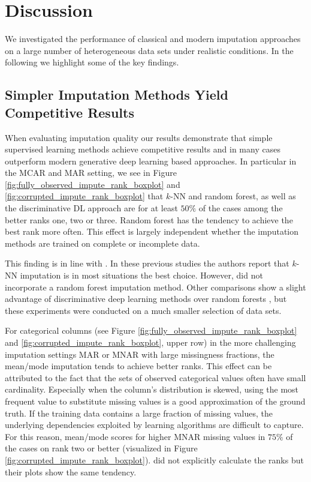 \section{Discussion}
\label{sec:discussion}

We investigated the performance of classical and modern imputation approaches on a large number of heterogeneous data sets under realistic conditions. In the following we highlight some of the key findings.

\subsection{Simpler Imputation Methods Yield Competitive Results}
%
When evaluating imputation quality our results demonstrate that simple supervised learning methods achieve competitive results and in many cases outperform modern generative deep learning based approaches. In particular in the MCAR and MAR setting, we see in Figure \ref{fig:fully_observed_impute_rank_boxplot} and \ref{fig:corrupted_impute_rank_boxplot} that $k$-NN and random forest, as well as the discriminative DL approach are for at least $50\%$ of the cases among the better ranks one, two or three. Random forest has the tendency to achieve the best rank more often. This effect is largely independent whether the imputation methods are trained on complete or incomplete data.

This finding is in line with \cite{Imputation_Benchmark_3, Imputation_Benchmark_2, Imputation_Benchmark_4}. In these previous studies the authors report that $k$-NN imputation is in most situations the best choice. However, \cite{Imputation_Benchmark_2, Imputation_Benchmark_4} did not incorporate a random forest imputation method. Other comparisons show a slight advantage of discriminative deep learning methods over random forests \citep{biessmann2019datawig}, but these experiments were conducted on a much smaller selection of data sets.

For categorical columns (see Figure \ref{fig:fully_observed_impute_rank_boxplot} and \ref{fig:corrupted_impute_rank_boxplot}, upper row) in the more challenging imputation settings MAR or MNAR with large missingness fractions, the mean/mode imputation tends to achieve better ranks. This effect can be attributed to the fact that the sets of observed categorical values often have small cardinality. Especially when the column's distribution is skewed, using the most frequent value to substitute missing values is a good approximation of the ground truth. If the training data contains a large fraction of missing values, the underlying dependencies exploited by learning algorithms are difficult to capture. For this reason, mean/mode scores for higher MNAR missing values in $75\%$ of the cases on rank two or better (visualized in Figure \ref{fig:corrupted_impute_rank_boxplot}). \cite{Imputation_Benchmark_3} did not explicitly calculate the ranks but their plots show the same tendency.


